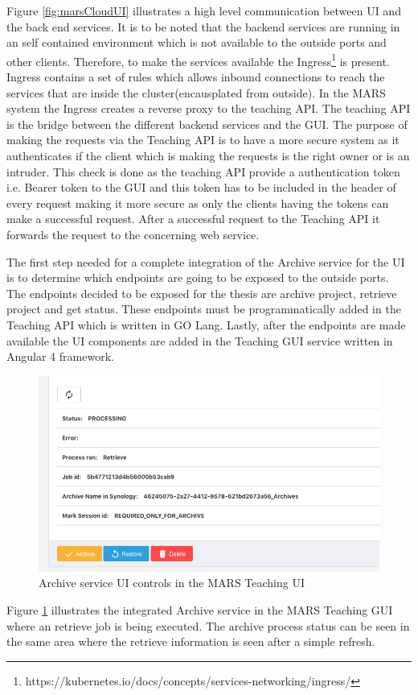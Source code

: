 Figure \ref{fig:marsCloudUI} illustrates a high level communication between UI and the back end services. It is to be noted that the backend services
are running in an self contained environment which is not available to the outside ports and other clients. Therefore, 
to make the services available the Ingress\footnote{https://kubernetes.io/docs/concepts/services-networking/ingress/} is present. Ingress contains
a set of rules which allows inbound connections to reach the services that are inside the cluster(encausplated from outside). In the MARS system
the Ingress creates a reverse proxy to the teaching API. The teaching API is the bridge between the different backend services and the GUI. The purpose
of making the requests via the Teaching API is to have a more secure system as it authenticates if the client which is making the requests is the right owner or 
is an intruder. This check is done as the teaching API provide a authentication token i.e. Bearer token to the GUI and this token has to be included in the
header of every request making it more secure as only the clients having the tokens can make a successful request. After a successful request to the Teaching API
it forwards the request to the concerning web service.


The first step needed for a complete integration of the Archive service for the UI is to determine which endpoints are going to be exposed to the outside ports.
The endpoints decided to be exposed for the thesis are archive project, retrieve project and get status. These endpoints must be programmatically added
in the Teaching API which is written in GO Lang. Lastly, after the endpoints are made available the UI components are added in the Teaching GUI service
written in Angular 4 framework. 

\begin{figure}[H]
    \centering \includegraphics[scale=0.5]{grafiken/archiveUI.png}
    \caption{Archive service UI controls in the MARS Teaching UI}
    \label{fig:archiveUI}
\end{figure}

Figure \ref{fig:archiveUI} illustrates the integrated Archive service in the MARS Teaching GUI where an retrieve job is being executed. The archive process
status can be seen in the same area where the retrieve information is seen after a simple refresh.
